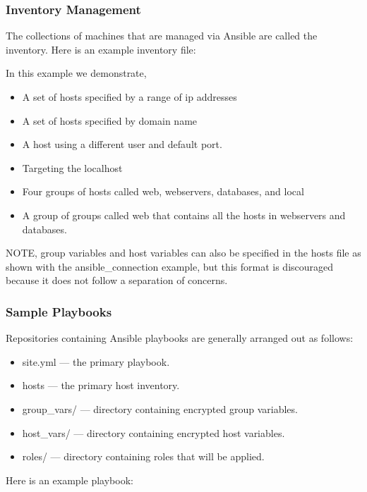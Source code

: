 \subsubsection{Inventory Management}
The collections of machines that are managed via Ansible are called the inventory.  Here is an example inventory file:



In this example we demonstrate, 
\begin{itemize}
	\item A set of hosts specified by a range of ip addresses
	\item A set of hosts specified by domain name
	\item A host using a different user and default port.
	\item Targeting the localhost
	\item Four groups of hosts called web, webservers, databases, and local
	\item A group of groups called web that contains all the hosts in webservers and databases.
\end{itemize}
NOTE, group variables and host variables can also be specified in the hosts file as shown with the ansible\_connection example, but this format is discouraged because it does not follow a separation of concerns.

\subsubsection{Sample Playbooks}

Repositories containing Ansible playbooks  are generally arranged out as follows:

\begin{itemize}
\item site.yml --- the primary playbook.
\item hosts --- the primary host inventory.
\item group\_vars/ --- directory containing encrypted group variables.
\item host\_vars/ --- directory containing encrypted host variables.
\item roles/ --- directory containing roles that will be applied.
\end{itemize}

Here is an example playbook:

